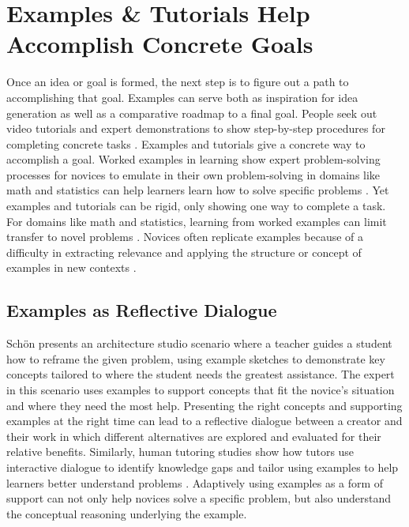 \section{Examples \& Tutorials Help Accomplish Concrete Goals}
Once an idea or goal is formed, the next step is to figure out a path to accomplishing that goal. Examples can serve both as inspiration for idea generation as well as a comparative roadmap to a final goal. People seek out video tutorials and expert demonstrations to show step-by-step procedures for completing concrete tasks \cite{chi2012mixt, Hennessey, van2003, van2016effects}. Examples and tutorials give a concrete way to accomplish a goal. Worked examples in learning show expert problem-solving processes for novices to emulate in their own problem-solving  in domains like math and statistics can help learners learn how to solve specific problems \cite{atkinson2000learning, Chi1989, tuovinen1999comparison, ward1990structuring}. Yet examples and tutorials can be rigid, only showing one way to complete a task. For domains like math and statistics, learning from worked examples can limit transfer to novel problems \cite{Glogger-Frey2015, Schwartz2011, Schwartz2004}. Novices often replicate examples because of a difficulty in extracting relevance and applying the structure or concept of examples in new contexts \cite{javadi2012impact}.

\subsection{Examples as Reflective Dialogue}
Sch{\"o}n \cite{schon1984reflective} presents an architecture studio scenario where a teacher guides a student how to reframe the given problem, using example sketches to demonstrate key concepts tailored to where the student needs the greatest assistance. The expert in this scenario uses examples to support concepts that fit the novice's situation and where they need the most help. Presenting the right concepts and supporting examples at the right time can lead to a reflective dialogue between a creator and their work in which different alternatives are explored and evaluated for their relative benefits. Similarly, human tutoring studies show how tutors use interactive dialogue to identify knowledge gaps and tailor using examples to help learners better understand problems \cite{Chi2001,mclaren2008}. Adaptively using examples as a form of support can not only help novices solve a specific problem, but also understand the conceptual reasoning underlying the example.

